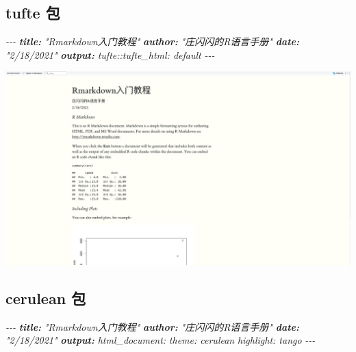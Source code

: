 \documentclass[
]{book}
\newenvironment{Shaded}{\begin{snugshade}}{\end{snugshade}}
\newcommand{\AnnotationTok}[1]{\textcolor[rgb]{0.56,0.35,0.01}{\textbf{\textit{#1}}}}
\newcommand{\CommentTok}[1]{\textcolor[rgb]{0.56,0.35,0.01}{\textit{#1}}}
\begin{document}
\hypertarget{tufte-ux5305}{%
\subsection{tufte 包}\label{tufte-ux5305}}

\begin{Shaded}
\begin{Highlighting}[]
\CommentTok{{-}{-}{-}}
\AnnotationTok{title:}\CommentTok{ "Rmarkdown入门教程"}
\AnnotationTok{author:}\CommentTok{ "庄闪闪的R语言手册"}
\AnnotationTok{date:}\CommentTok{ "2/18/2021"}
\AnnotationTok{output:}
\CommentTok{  tufte::tufte\_html: default}
\CommentTok{{-}{-}{-}}
\end{Highlighting}
\end{Shaded}

\includegraphics{images/paste-720E8336.png}

\hypertarget{cerulean-ux5305}{%
\subsection{cerulean 包}\label{cerulean-ux5305}}

\begin{Shaded}
\begin{Highlighting}[]
\CommentTok{{-}{-}{-}}
\AnnotationTok{title:}\CommentTok{ "Rmarkdown入门教程"}
\AnnotationTok{author:}\CommentTok{ "庄闪闪的R语言手册"}
\AnnotationTok{date:}\CommentTok{ "2/18/2021"}
\AnnotationTok{output:}
\CommentTok{  html\_document:}
\CommentTok{    theme: cerulean}
\CommentTok{    highlight: tango}
\CommentTok{{-}{-}{-}}
\end{Highlighting}
\end{Shaded}
\end{document}
